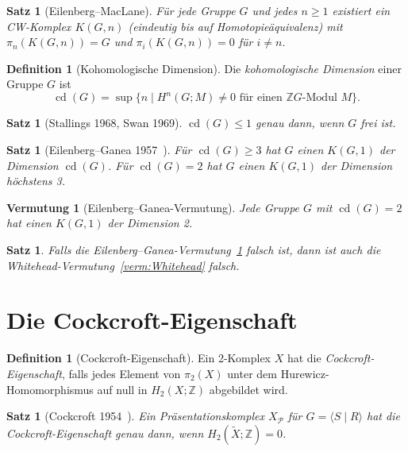 \documentclass[12pt,a4paper]{amsart}
\newtheorem{satz}[theorem]{Satz}
\newtheorem{vermutung}[theorem]{Vermutung}
\theoremstyle{definition}
\newtheorem{definition_de}[theorem]{Definition}
\theoremstyle{remark}
\newcommand{\Z}{\mathbb{Z}}
\DeclareMathOperator{\cd}{cd}
\begin{document}
\begin{satz}[Eilenberg--MacLane]
Für jede Gruppe $G$ und jedes $n \geq 1$ existiert ein CW-Komplex $K(G,n)$
(eindeutig bis auf Homotopieäquivalenz) mit $\pi_n(K(G,n)) = G$ und
$\pi_i(K(G,n)) = 0$ für $i \neq n$.
\end{satz}

\begin{definition_de}[Kohomologische Dimension]
Die \emph{kohomologische Dimension} einer Gruppe $G$ ist
\[
    \cd(G) = \sup\{ n \mid H^n(G; M) \neq 0 \text{ für einen $\Z G$-Modul $M$} \}.
\]
\end{definition_de}

\begin{satz}[Stallings 1968, Swan 1969]
$\cd(G) \leq 1$ genau dann, wenn $G$ frei ist.
\end{satz}

\begin{satz}[Eilenberg--Ganea 1957~\cite{EilenbergGanea1957}]
Für $\cd(G) \geq 3$ hat $G$ einen $K(G,1)$ der Dimension $\cd(G)$.
Für $\cd(G) = 2$ hat $G$ einen $K(G,1)$ der Dimension höchstens 3.
\end{satz}

\begin{vermutung}[Eilenberg--Ganea-Vermutung]
\label{verm:EG}
Jede Gruppe $G$ mit $\cd(G) = 2$ hat einen $K(G,1)$ der Dimension 2.
\end{vermutung}

\begin{satz}
Falls die Eilenberg--Ganea-Vermutung~\ref{verm:EG} falsch ist, dann ist
auch die Whitehead-Vermutung~\ref{verm:Whitehead} falsch.
\end{satz}

\section{Die Cockcroft-Eigenschaft}

\begin{definition_de}[Cockcroft-Eigenschaft]
Ein 2-Komplex $X$ hat die \emph{Cockcroft-Eigenschaft}, falls jedes Element
von $\pi_2(X)$ unter dem Hurewicz-Homomorphismus auf null in $H_2(X; \Z)$
abgebildet wird.
\end{definition_de}

\begin{satz}[Cockcroft 1954~\cite{Cockcroft1954}]
Ein Präsentationskomplex $X_{\mathcal{P}}$ für $G = \langle S \mid R \rangle$
hat die Cockcroft-Eigenschaft genau dann, wenn $H_2(\widetilde{X}; \Z) = 0$.
\end{satz}
\end{document}
